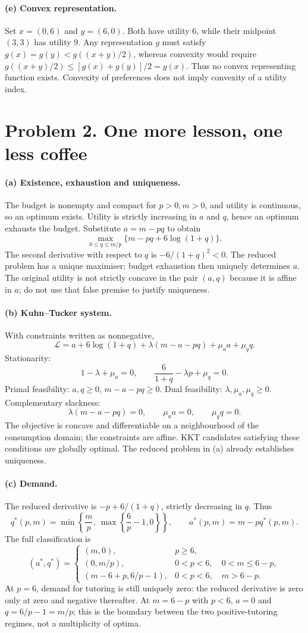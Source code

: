 \documentclass[11pt,a4paper]{article}
\begin{document}
\paragraph{(e) Convex representation.} Set $x=(0,6)$ and $y=(6,0)$. Both have utility 6, while their midpoint $(3,3)$ has utility 9. Any representation $g$ must satisfy $g(x)=g(y)<g((x+y)/2)$, whereas convexity would require $g((x+y)/2)\le[g(x)+g(y)]/2=g(x)$. Thus no convex representing function exists. Convexity of preferences does not imply convexity of a utility index.
\clearpage
\section*{Problem 2. One more lesson, one less coffee}
\paragraph{(a) Existence, exhaustion and uniqueness.} The budget is nonempty and compact for $p>0,m>0$, and utility is continuous, so an optimum exists. Utility is strictly increasing in $a$ and $q$, hence an optimum exhausts the budget. Substitute $a=m-pq$ to obtain
\[
 \max_{0\le q\le m/p}\{m-pq+6\log(1+q)\}.
\]
The second derivative with respect to $q$ is $-6/(1+q)^2<0$. The reduced problem has a unique maximiser; budget exhaustion then uniquely determines $a$. The original utility is not strictly concave in the pair $(a,q)$ because it is affine in $a$; do not use that false premise to justify uniqueness.
\paragraph{(b) Kuhn--Tucker system.} With constraints written as nonnegative,
\[
 \mathcal L=a+6\log(1+q)+\lambda(m-a-pq)+\mu_a a+\mu_q q.
\]
Stationarity:
\[
 1-\lambda+\mu_a=0,\qquad
 \frac6{1+q}-\lambda p+\mu_q=0.
\]
Primal feasibility: $a,q\ge0$, $m-a-pq\ge0$. Dual feasibility: $\lambda,\mu_a,\mu_q\ge0$. Complementary slackness:
\[
 \lambda(m-a-pq)=0,\qquad \mu_a a=0,\qquad\mu_q q=0.
\]
The objective is concave and differentiable on a neighbourhood of the consumption domain; the constraints are affine. KKT candidates satisfying these conditions are globally optimal. The reduced problem in (a) already establishes uniqueness.
\paragraph{(c) Demand.} The reduced derivative is $-p+6/(1+q)$, strictly decreasing in $q$. Thus
\[
 q^*(p,m)=\min\left\{\frac m p,\ \max\left\{\frac6p-1,0\right\}\right\},\qquad
 a^*(p,m)=m-pq^*(p,m).
\]
The full classification is
\[
 (a^*,q^*)=
 \begin{cases}
 (m,0),&p\ge6,\\[1mm]
 (0,m/p),&0<p<6,\quad 0<m\le6-p,\\[1mm]
 (m-6+p,6/p-1),&0<p<6,\quad m>6-p.
 \end{cases}
\]
At $p=6$, demand for tutoring is still uniquely zero: the reduced derivative is zero only at zero and negative thereafter. At $m=6-p$ with $p<6$, $a=0$ and $q=6/p-1=m/p$; this is the boundary between the two positive-tutoring regimes, not a multiplicity of optima.
\end{document}
